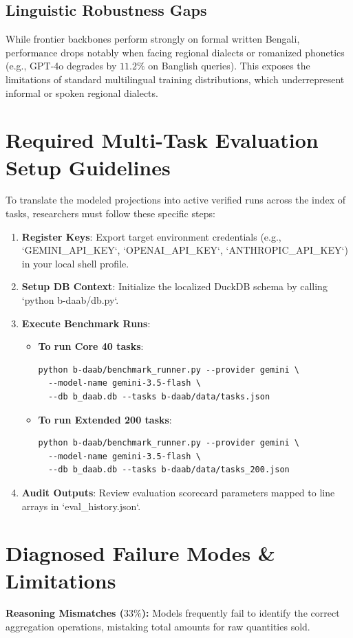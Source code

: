 \documentclass{article}
\begin{document}
\subsection{Linguistic Robustness Gaps}
While frontier backbones perform strongly on formal written Bengali, performance drops notably when facing regional dialects or romanized phonetics (e.g., GPT-4o degrades by $11.2\%$ on Banglish queries). This exposes the limitations of standard multilingual training distributions, which underrepresent informal or spoken regional dialects.

\section{Required Multi-Task Evaluation Setup Guidelines}
To translate the modeled projections into active verified runs across the index of tasks, researchers must follow these specific steps:
\begin{enumerate}
    \item \textbf{Register Keys}: Export target environment credentials (e.g., `GEMINI_API_KEY`, `OPENAI_API_KEY`, `ANTHROPIC_API_KEY`) in your local shell profile.
    \item \textbf{Setup DB Context}: Initialize the localized DuckDB schema by calling `python b-daab/db.py`.
    \item \textbf{Execute Benchmark Runs}:
    \begin{itemize}
        \item \textbf{To run Core 40 tasks}:
        \begin{verbatim}
python b-daab/benchmark_runner.py --provider gemini \
  --model-name gemini-3.5-flash \
  --db b_daab.db --tasks b-daab/data/tasks.json
        \end{verbatim}
        \item \textbf{To run Extended 200 tasks}:
        \begin{verbatim}
python b-daab/benchmark_runner.py --provider gemini \
  --model-name gemini-3.5-flash \
  --db b_daab.db --tasks b-daab/data/tasks_200.json
        \end{verbatim}
    \end{itemize}
    \item \textbf{Audit Outputs}: Review evaluation scorecard parameters mapped to line arrays in `eval_history.json`.
\end{enumerate}

\section{Diagnosed Failure Modes & Limitations}
\textbf{Reasoning Mismatches ($33\%$):} Models frequently fail to identify the correct aggregation operations, mistaking total amounts for raw quantities sold.
\end{document}
